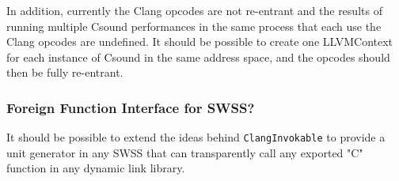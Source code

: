 \documentclass[letterpaper, 12pt]{article}
\begin{document}
In addition, currently the Clang opcodes are not re-entrant and the results of running multiple Csound performances in the same process that each use the Clang opcodes are undefined. It should be possible to create one LLVMContext for each instance of Csound in the same address space, and the opcodes should then be fully re-entrant.

\subsubsection{Foreign Function Interface for SWSS?}

It should be possible to extend the ideas behind \verb|ClangInvokable| to provide a unit generator in any SWSS that can transparently call any exported "C" function in any dynamic link library.



\end{document}
